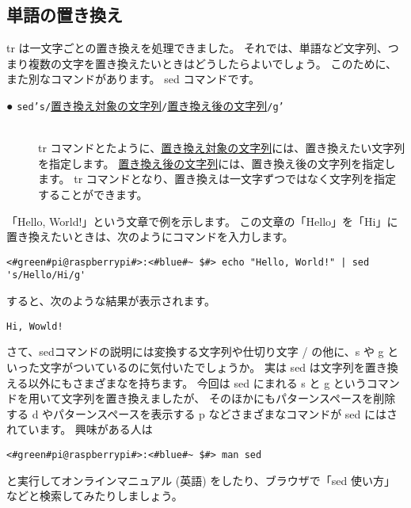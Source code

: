 \subsection{単語の置き換え}
tr は一文字ごとの置き換えを処理できました。
それでは、単語など文字列、つまり複数の文字を置き換えたいときはどうしたらよいでしょう。
このために、また別なコマンドがあります。
sed コマンドです。


\begin{description}
    \item[● \texttt{sed}\textvisiblespace\texttt{'s/}\underline{置き換え対象の文字列}\texttt{/}\underline{置き換え後の文字列}\texttt{/g'}]\mbox{}\\
    tr コマンドとたように、\underline{置き換え対象の文字列}には、置き換えたい文字列を指定します。
    \underline{置き換え後の文字列}には、置き換え後の文字列を指定します。
    tr コマンドとなり、置き換えは一文字ずつではなく文字列を指定することができます。
\end{description}

「Hello, World!」という文章で例を示します。
この文章の「Hello」を「Hi」に置き換えたいときは、次のようにコマンドを入力します。
\begin{lstlisting}[caption=sed コマンドを使った例, label=sed_app]
<#green#pi@raspberrypi#>:<#blue#~ $#> echo "Hello, World!" | sed 's/Hello/Hi/g'
\end{lstlisting}
すると、次のような結果が表示されます。
\begin{lstlisting}[caption=sed コマンドで変換した結果, label=sed_result]
Hi, Wowld!
\end{lstlisting}

さて、sedコマンドの説明には変換する文字列や仕切り文字 / の他に、s や g といった文字がついているのに気付いたでしょうか。
実は sed は文字列を置き換える以外にもさまざまなを持ちます。
今回は sed にまれる s と g というコマンドを用いて文字列を置き換えましたが、
そのほかにもパターンスペースを削除する d やパターンスペースを表示する p などさまざまなコマンドが sed にはされています。
興味がある人は
\begin{lstlisting}
<#green#pi@raspberrypi#>:<#blue#~ $#> man sed
\end{lstlisting}
と実行してオンラインマニュアル (英語) をしたり、ブラウザで「sed 使い方」などと検索してみたりしましょう。


